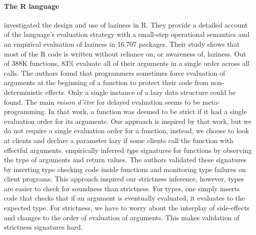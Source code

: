 \documentclass[review,nonacm,screen,acmsmall,anonymous=true]{acmart}
\begin{document}
\paragraph{The R language} \citet{oopsla19b} investigated the design and use of
laziness in R. They provide a detailed account of the language's evaluation
strategy with a small-step operational semantics and an empirical evaluation of
laziness in 16,707 packages. Their study shows that most of the R code is written
without reliance on, or awareness of, laziness. Out of 388K functions, 83\%
evaluate all of their arguments in a single order across all calls. The authors
found that programmers sometimes force evaluation of arguments at the beginning
of a function to protect their code from non-deterministic effects. Only a
single instance of a lazy data structure could be found. The main \emph{raison
d'\^etre} for delayed evaluation seems to be meta-programming. In that work, a
function was deemed to be strict if it had a single evaluation order for its
arguments. Our approach is inspired by that work, but we do not require a single
evaluation order for a function, instead, we choose to look at clients and
declare a parameter lazy if some clients call the function with effectful
arguments. \citet{oopsla20b} empirically inferred \emph{type} signatures for
functions by observing the type of arguments and return values. The authors
validated these signatures by inserting type checking code inside functions and
monitoring type failures on client programs. This approach inspired our strictness
inference, however, types are easier to check for soundness than strictness. For
types, one simply inserts code that checks that if an argument is eventually
evaluated, it evaluates to the expected type. For strictness, we have to worry
about the interplay of side-effects and changes to the order of evaluation of
arguments. This makes validation of strictness signatures hard.
\end{document}

